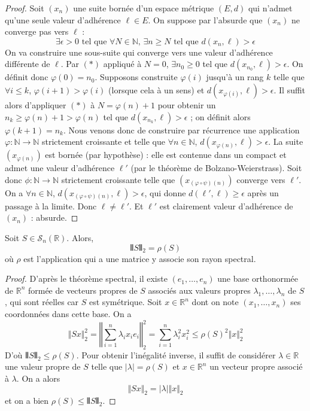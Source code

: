   \begin{proof}
    Soit $(x_n)$ une suite bornée d'un espace métrique $(E, d)$ qui n'admet qu'une seule valeur d'adhérence $\ell \in E$. On suppose par l'absurde que $(x_n)$ ne converge pas vers $\ell$ :
    \[ \exists \epsilon > 0 \text{ tel que } \forall N \in \mathbb{N}, \, \exists n \geq N \text{ tel que } d(x_n, \ell) > \epsilon \tag{$*$} \]
    On va construire une sous-suite qui converge vers une valeur d'adhérence différente de $\ell$.
    \newpar
    Par $(*)$ appliqué à $N = 0$, $\exists n_0 \geq 0$ tel que $d(x_{n_0}, \ell) > \epsilon$. On définit donc $\varphi(0) = n_0$.
    \newpar
    Supposons construite $\varphi(i)$ jusqu'à un rang $k$ telle que $\forall i \leq k$, $\varphi(i+1) > \varphi(i)$ (lorsque cela à un sens) et $d(x_{\varphi(i)}, \ell) > \epsilon$. Il suffit alors d'appliquer $(*)$ à $N = \varphi(n) + 1$ pour obtenir un $n_k \geq \varphi(n) + 1 > \varphi(n)$ tel que $d(x_{n_k}, \ell) > \epsilon$ ; on définit alors $\varphi(k+1) = n_k$.
    \newpar
    Nous venons donc de construire par récurrence une application $\varphi : \mathbb{N} \rightarrow \mathbb{N}$ strictement croissante et telle que $\forall n \in \mathbb{N}$, $d(x_{\varphi(n)}, \ell) > \epsilon$. La suite $(x_{\varphi(n)})$ est bornée (par hypothèse) : elle est contenue dans un compact et admet une valeur d'adhérence $\ell'$ (par le théorème de Bolzano-Weierstrass). Soit donc $\phi : \mathbb{N} \rightarrow \mathbb{N}$ strictement croissante telle que $(x_{(\varphi \circ \psi)(n)})$ converge vers $\ell'$.
    \newpar
    On a $\forall n \in \mathbb{N}$, $d(x_{(\varphi \circ \psi)(n)}, \ell) > \epsilon$, qui donne $d(\ell', \ell) \geq \epsilon$ après un passage à la limite. Donc $\ell \neq \ell'$.  Et $\ell'$ est clairement valeur d'adhérence de $(x_n)$ : absurde.
  \end{proof}


  \begin{lemma}
    \label{homeomorphisme-de-l-exponentielle-3}
    Soit $S \in \mathcal{S}_n(\mathbb{R})$. Alors,
    \[ \VERT S \VERT_2 = \rho(S) \]
    où $\rho$ est l'application qui a une matrice y associe son rayon spectral.
  \end{lemma}

  \begin{proof}
    D'après le théorème spectral, il existe $(e_1, \dots, e_n)$ une base orthonormée de $\mathbb{R}^n$ formée de vecteurs propres de $S$ associés aux valeurs propres $\lambda_1, \dots, \lambda_n$ de $S$, qui sont réelles car $S$ est symétrique. Soit $x \in \mathbb{R}^n$ dont on note $(x_1, \dots, x_n)$ ses coordonnées dans cette base. On a
    \[ \Vert Sx \Vert_2^2 = \left \Vert \sum_{i=1}^{n} \lambda_i x_i e_i \right \Vert_2^2 = \sum_{i=1}^n \lambda_i^2 x_i^2 \leq \rho(S)^2 \Vert x \Vert_2^2 \]
    D'où $\VERT S \VERT_2 \leq \rho(S)$. Pour obtenir l'inégalité inverse, il suffit de considérer $\lambda \in \mathbb{R}$ une valeur propre de $S$ telle que $|\lambda| = \rho(S)$ et $x \in \mathbb{R}^n$ un vecteur propre associé à $\lambda$. On a alors
    \[ \Vert Sx \Vert_2 = |\lambda| \Vert x \Vert_2 \]
    et on a bien $\rho(S) \leq \VERT S \VERT_2$.
  \end{proof}

